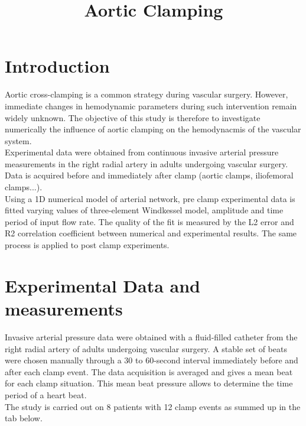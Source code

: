 \documentclass{config}
\title{Aortic Clamping}
\begin{document}
\maketitle

\section{Introduction}

Aortic cross-clamping is a common strategy during vascular surgery. However, immediate changes in hemodynamic parameters during such intervention remain widely unknown.  The objective of this study is therefore to investigate numerically the influence of aortic clamping on the hemodynacmis of the vascular system. \\ 

Experimental data were obtained from continuous invasive arterial pressure measurements in the right radial artery in adults undergoing vascular surgery. Data is acquired before and immediately after clamp (aortic clamps, iliofemoral clamps...). \\
 
Using a 1D numerical model of arterial network, pre clamp experimental data is fitted varying values of three-element Windkessel model, amplitude and time period of input flow rate. The quality of the fit is measured by the L2 error and R2 correlation coefficient between numerical and experimental results. The same process is applied to post clamp experiments. \\

\section{Experimental Data and measurements}

Invasive arterial pressure data were obtained with a fluid-filled catheter from the right radial artery of adults undergoing vascular surgery. A stable set of beats were chosen manually through a 30 to 60-second interval immediately before and after each clamp event. The data acquisition is averaged and gives a mean beat for each clamp situation. This mean beat pressure allows to determine the time period of a heart beat. \\

The study is carried out on 8 patients with 12 clamp events as summed up in the tab below. 
\end{document}
